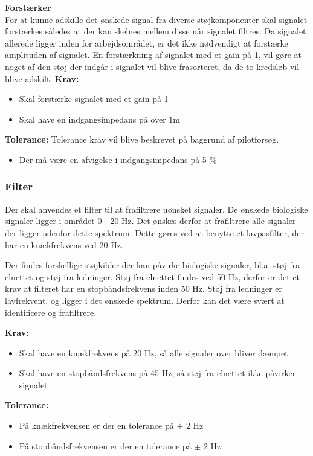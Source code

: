 \textbf{Forstærker}\\
For at kunne adskille det ønskede signal fra diverse støjkomponenter skal signalet forstærkes således at der kan skelnes mellem disse når signalet filtres. Da signalet allerede ligger inden for arbejdsområdet, er det ikke nødvendigt at forstærke amplituden af signalet. En forstærkning af signalet med et gain på 1, vil gøre at noget af den støj der indgår i signalet vil blive frasorteret, da de to kredsløb vil blive adskilt. 
\textbf{Krav:}
\begin{itemize}
\item Skal forstærke signalet med et gain på 1
\item Skal have en indgangsimpedans på over 1m\Omega
\end{itemize}

\textbf{Tolerance:}
Tolerance krav vil blive beskrevet på baggrund af pilotforsøg.
\begin{itemize}
\item Der må være en afvigelse i indgangsimpedans på 5 \%
\end{itemize}

\subsubsection{Filter}
Der skal anvendes et filter til at frafiltrere uønsket signaler. De ønskede biologiske signaler ligger i området 0 - 20 Hz. Det ønskes derfor at frafiltrere alle signaler der ligger udenfor dette spektrum. Dette gøres ved at benytte et lavpasfilter, der har en knækfrekvens ved 20 Hz. 

Der findes forskellige støjkilder der kan påvirke biologiske signaler, bl.a. støj fra elnettet og støj fra ledninger. Støj fra elnettet findes ved 50 Hz, derfor er det et krav at filteret har en stopbåndsfrekvens inden 50 Hz. Støj fra ledninger er lavfrekvent, og ligger i det ønskede spektrum. Derfor kan det være svært at identificere og frafiltrere. 

\textbf{Krav:}
\begin{itemize}
\item Skal have en knækfrekvens på 20 Hz, så alle signaler over bliver dæmpet
\item Skal have en stopbåndsfrekvens på 45 Hz, så støj fra elnettet ikke påvirker signalet
\end{itemize}

\textbf{Tolerance:}
\begin{itemize}
\item På knækfrekvensen er der en tolerance på $\pm$ 2 Hz
\item På stopbåndsfrekvensen er der en tolerance på $\pm$ 2 Hz
\end{itemize}

